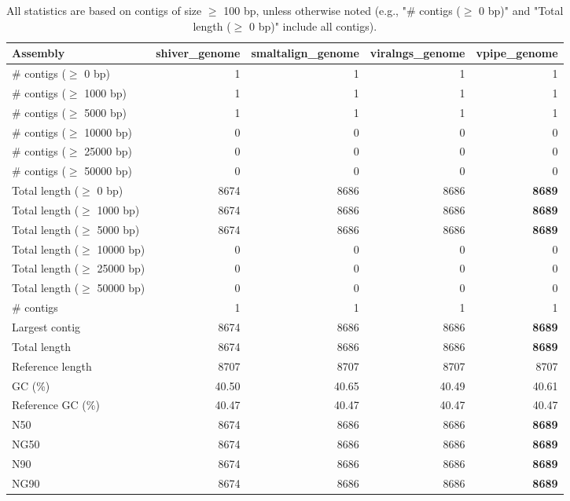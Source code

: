\documentclass[12pt,a4paper]{article}
\begin{document}
\begin{table}[ht]
\begin{center}
\caption{All statistics are based on contigs of size $\geq$ 100 bp, unless otherwise noted (e.g., "\# contigs ($\geq$ 0 bp)" and "Total length ($\geq$ 0 bp)" include all contigs).}
\begin{tabular}{|l*{4}{|r}|}
\hline
Assembly & shiver\_genome & smaltalign\_genome & viralngs\_genome & vpipe\_genome \\ \hline
\# contigs ($\geq$ 0 bp) & 1 & 1 & 1 & 1 \\ \hline
\# contigs ($\geq$ 1000 bp) & 1 & 1 & 1 & 1 \\ \hline
\# contigs ($\geq$ 5000 bp) & 1 & 1 & 1 & 1 \\ \hline
\# contigs ($\geq$ 10000 bp) & 0 & 0 & 0 & 0 \\ \hline
\# contigs ($\geq$ 25000 bp) & 0 & 0 & 0 & 0 \\ \hline
\# contigs ($\geq$ 50000 bp) & 0 & 0 & 0 & 0 \\ \hline
Total length ($\geq$ 0 bp) & 8674 & 8686 & 8686 & {\bf 8689} \\ \hline
Total length ($\geq$ 1000 bp) & 8674 & 8686 & 8686 & {\bf 8689} \\ \hline
Total length ($\geq$ 5000 bp) & 8674 & 8686 & 8686 & {\bf 8689} \\ \hline
Total length ($\geq$ 10000 bp) & 0 & 0 & 0 & 0 \\ \hline
Total length ($\geq$ 25000 bp) & 0 & 0 & 0 & 0 \\ \hline
Total length ($\geq$ 50000 bp) & 0 & 0 & 0 & 0 \\ \hline
\# contigs & 1 & 1 & 1 & 1 \\ \hline
Largest contig & 8674 & 8686 & 8686 & {\bf 8689} \\ \hline
Total length & 8674 & 8686 & 8686 & {\bf 8689} \\ \hline
Reference length & 8707 & 8707 & 8707 & 8707 \\ \hline
GC (\%) & 40.50 & 40.65 & 40.49 & 40.61 \\ \hline
Reference GC (\%) & 40.47 & 40.47 & 40.47 & 40.47 \\ \hline
N50 & 8674 & 8686 & 8686 & {\bf 8689} \\ \hline
NG50 & 8674 & 8686 & 8686 & {\bf 8689} \\ \hline
N90 & 8674 & 8686 & 8686 & {\bf 8689} \\ \hline
NG90 & 8674 & 8686 & 8686 & {\bf 8689} \\ \hline

\end{tabular}
\end{center}
\end{table}
\end{document}
